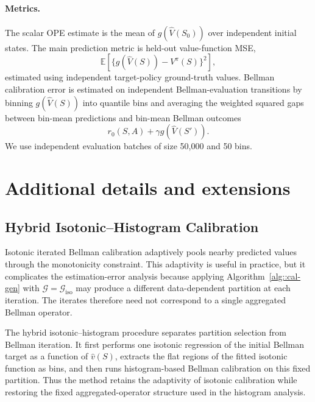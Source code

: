 \documentclass{article}
\theoremstyle{plain}
\theoremstyle{definition}
\theoremstyle{remark}
\begin{document}
\paragraph{Metrics.}
The scalar OPE estimate is the mean of \(g(\widehat V(S_0))\) over independent
initial states. The main prediction metric is held-out value-function MSE,
\[
  \mathbb{E}\!\left[\{g(\widehat V(S))-V^\pi(S)\}^2\right],
\]
estimated using independent target-policy ground-truth values. Bellman calibration
error is estimated on independent Bellman-evaluation transitions by binning
\(g(\widehat V(S))\) into quantile bins and averaging the weighted squared gaps
between bin-mean predictions and bin-mean Bellman outcomes
\[
  r_0(S,A)+\gamma g(\widehat V(S')) .
\]
We use independent evaluation batches  of size 50,000 and 50 bins.  


 
 



\section{Additional details and extensions}
 



\subsection{Hybrid Isotonic--Histogram Calibration}
\label{appendix::hybrid}

Isotonic iterated Bellman calibration adaptively pools nearby predicted values
through the monotonicity constraint. This adaptivity is useful in practice, but
it complicates the estimation-error analysis because applying
Algorithm~\ref{alg::cal-gen} with \(\mathcal G=\mathcal G_{\mathrm{iso}}\) may
produce a different data-dependent partition at each iteration. The iterates
therefore need not correspond to a single aggregated Bellman operator.

The hybrid isotonic--histogram procedure separates partition selection from
Bellman iteration. It first performs one isotonic regression of the initial
Bellman target as a function of \(\hat v(S)\), extracts the flat regions of the
fitted isotonic function as bins, and then runs histogram-based Bellman
calibration on this fixed partition. Thus the method retains the adaptivity of
isotonic calibration while restoring the fixed aggregated-operator structure
used in the histogram analysis.
\end{document}
